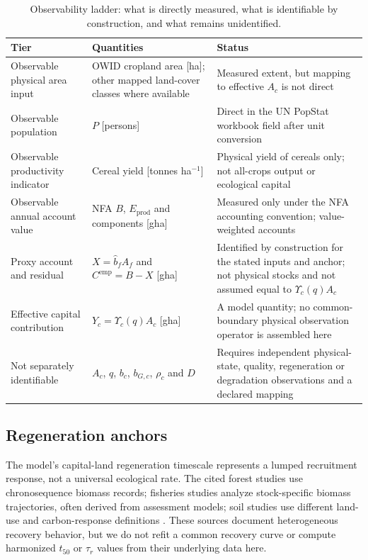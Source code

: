 \documentclass[11pt,a4paper]{article}
\newcommand{\Ups}{\Upsilon_c}
\begin{document}
\begin{table}[htbp]
\centering\small
\caption{Observability ladder: what is directly measured, what is identifiable by construction, and what remains unidentified.}
\label{tab:si_ladder}
\begin{tabularx}{\textwidth}{>{\raggedright\arraybackslash}p{} X >{\raggedright\arraybackslash}p{}}
\toprule
Tier & Quantities & Status \\
\midrule
Observable physical area input & OWID cropland area [ha]; other mapped land-cover classes where available & Measured extent, but mapping to effective $A_c$ is not direct \\
Observable population & $P$ [persons] & Direct in the UN PopStat workbook field after unit conversion \\
Observable productivity indicator & Cereal yield [tonnes ha$^{-1}$] & Physical yield of cereals only; not all-crops output or ecological capital \\
Observable annual account value & NFA $B$, $E_{\mathrm{prod}}$ and components [gha] & Measured only under the NFA accounting convention; value-weighted accounts \\
Proxy account and residual & $X=\hat b_fA_f$ and $C^{\mathrm{emp}}=B-X$ [gha] & Identified by construction for the stated inputs and anchor; not physical stocks and not assumed equal to $\Ups(q)A_c$ \\
Effective capital contribution & $Y_c=\Ups(q)A_c$ [gha] & A model quantity; no common-boundary physical observation operator is assembled here \\
Not separately identifiable & $A_c$, $q$, $b_c$, $b_{G,c}$, $\rho_c$ and $D$ & Requires independent physical-state, quality, regeneration or degradation observations and a declared mapping \\
\bottomrule
\end{tabularx}
\end{table}

\subsection{Regeneration anchors}\label{si:anchors}

The model's capital-land regeneration timescale represents a lumped recruitment response, not a universal ecological rate. The cited forest studies use chronosequence biomass records; fisheries studies analyze stock-specific biomass trajectories, often derived from assessment models; soil studies use different land-use and carbon-response definitions \citep{Poorter2016,HutchingsReynolds2004,Neubauer2013,Poeplau2011}. These sources document heterogeneous recovery behavior, but we do not refit a common recovery curve or compute harmonized $t_{50}$ or $\tau_r$ values from their underlying data here.
\end{document}
